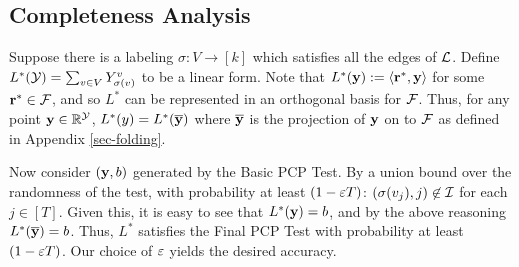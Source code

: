 \subsection{Completeness Analysis}
Suppose there is a labeling $\sigma :V \to [k]$ which satisfies all the edges of $\mathcal{L}$. Define $L^*(\mathcal{Y})
= \sum_{v \in V} Y^v_{\sigma(v)}$ to be a linear form. Note that $L^*({\bf y}) := \langle {\bf r}^*, {\bf y}\rangle$ for some ${\bf r}^* \in \mc{F}$, and so $L^*$ can be represented in an orthogonal basis for $\mathcal{F}$. Thus, for any point ${\bf y} \in \mathbb{R}^{\mc{Y}}$, $L^*(y) = L^*(\ol{\bf y})$ where $\ol{\bf y}$ is the projection of ${\bf y}$ on to $\mathcal{F}$ as defined in Appendix \ref{sec-folding}.

Now consider $({\bf y}, b)$ generated by the Basic PCP Test.
By a union bound over the randomness of the test,  with probability at least $(1 - \varepsilon T)$:  $(\sigma(v_j), j) \not\in \mathcal{I}$ for each $j \in [T]$. Given this, it is easy to see that $L^*({\bf y}) = b$, and by the above reasoning $L^*(\ol{\bf y}) = b$.  
Thus, $L^*$ satisfies the Final PCP Test with probability at least $(1 - \varepsilon T)$. Our choice of $\varepsilon$ yields the desired accuracy.
